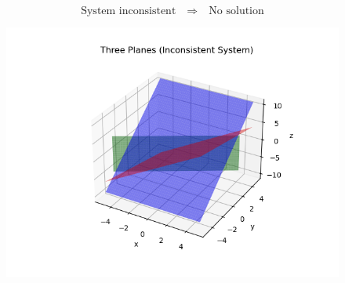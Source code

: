 \documentclass[journal]{article}
\begin{document}
\[
\text{System inconsistent}\quad\Rightarrow\quad\boxed{\text{No solution}}
\]
\newpage
\begin{figure}
    \centering
    \includegraphics[width=1.0\linewidth]{figs/fig1.png}
    \caption{}
    \label{fig:placeholder}
\end{figure}
\end{document}
